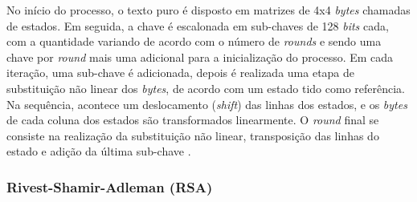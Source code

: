 \documentclass[a4paper,10pt,oneside,conference,final,keeplastbox]{inatel}
\newcommand{\bits}{\textit{bits}\xspace}
\newcommand{\bytes}{\textit{bytes}\xspace}
\newcommand{\Bytes}{\textit{Bytes}\xspace}
\newcommand{\forin}{\textbf{em}}
\begin{document}
                No início do processo, o texto puro é disposto em matrizes de 4x4 \bytes chamadas de estados. Em seguida, a chave é escalonada em sub-chaves de 128 \bits cada, com a quantidade variando de acordo com o número de \textit{rounds} e sendo uma chave por \textit{round} mais uma adicional para a inicialização do processo. Em cada iteração, uma sub-chave é adicionada, depois é realizada uma etapa de substituição não linear dos \bytes, de acordo com um estado tido como referência. Na sequência, acontece um deslocamento (\textit{shift}) das linhas dos estados, e os \bytes de cada coluna dos estados são transformados linearmente. O \textit{round} final se consiste na realização da substituição não linear, transposição das linhas do estado e adição da última sub-chave \cite{daemen2013aes}.%

            
            \subsubsection{Rivest-Shamir-Adleman (RSA)}
            \label{subsubsec:rsa}
            
\end{document}

